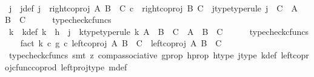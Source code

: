 \begin{isabellebody}
\isanewline
\ \ \isamarkupfalse%
\ j\ \ j{\isacharunderscore}{\kern0pt}def{\isacharcolon}{\kern0pt}\ {\isachardoublequoteopen}j\ {\isacharequal}{\kern0pt}\ {\isacharparenleft}{\kern0pt}right{\isacharunderscore}{\kern0pt}coproj\ A\ {\isacharparenleft}{\kern0pt}B\ {\isasymCoprod}\ C{\isacharparenright}{\kern0pt}{\isacharparenright}{\kern0pt}\ {\isasymcirc}\isactrlsub c\ \ {\isacharparenleft}{\kern0pt}right{\isacharunderscore}{\kern0pt}coproj\ B\ C{\isacharparenright}{\kern0pt}{\isachardoublequoteclose}\ \ j{\isacharunderscore}{\kern0pt}type{\isacharbrackleft}{\kern0pt}type{\isacharunderscore}{\kern0pt}rule{\isacharbrackright}{\kern0pt}{\isacharcolon}{\kern0pt}\ {\isachardoublequoteopen}j\ {\isacharcolon}{\kern0pt}\ C\ {\isasymrightarrow}\ A\ {\isasymCoprod}\ {\isacharparenleft}{\kern0pt}B\ {\isasymCoprod}\ C{\isacharparenright}{\kern0pt}{\isachardoublequoteclose}\isanewline
\ \ \ \ \isamarkupfalse%
\ typecheck{\isacharunderscore}{\kern0pt}cfuncs\isanewline
\ \ \isamarkupfalse%
\ k\ \ k{\isacharunderscore}{\kern0pt}def{\isacharcolon}{\kern0pt}\ {\isachardoublequoteopen}k\ {\isacharequal}{\kern0pt}\ h\ {\isasymamalg}\ j{\isachardoublequoteclose}\ \ k{\isacharunderscore}{\kern0pt}type{\isacharbrackleft}{\kern0pt}type{\isacharunderscore}{\kern0pt}rule{\isacharbrackright}{\kern0pt}{\isacharcolon}{\kern0pt}\ {\isachardoublequoteopen}k{\isacharcolon}{\kern0pt}\ {\isacharparenleft}{\kern0pt}A\ {\isasymCoprod}\ B{\isacharparenright}{\kern0pt}\ {\isasymCoprod}\ C\ {\isasymrightarrow}\ A\ {\isasymCoprod}\ {\isacharparenleft}{\kern0pt}B\ {\isasymCoprod}\ C{\isacharparenright}{\kern0pt}{\isachardoublequoteclose}\isanewline
\ \ \ \ \isamarkupfalse%
\ typecheck{\isacharunderscore}{\kern0pt}cfuncs\isanewline
\isanewline
\ \ \isamarkupfalse%
\ fact{}{\isacharcolon}{\kern0pt}\ {\isachardoublequoteopen}{\isacharparenleft}{\kern0pt}k\ {\isasymcirc}\isactrlsub c\ g{\isacharparenright}{\kern0pt}\ {\isasymcirc}\isactrlsub c\ {\isacharparenleft}{\kern0pt}left{\isacharunderscore}{\kern0pt}coproj\ A\ {\isacharparenleft}{\kern0pt}B\ {\isasymCoprod}\ C{\isacharparenright}{\kern0pt}{\isacharparenright}{\kern0pt}\ {\isacharequal}{\kern0pt}\ {\isacharparenleft}{\kern0pt}left{\isacharunderscore}{\kern0pt}coproj\ A\ {\isacharparenleft}{\kern0pt}B\ {\isasymCoprod}\ C{\isacharparenright}{\kern0pt}{\isacharparenright}{\kern0pt}{\isachardoublequoteclose}\isanewline
\ \ \ \ \isamarkupfalse%
\ {\isacharparenleft}{\kern0pt}typecheck{\isacharunderscore}{\kern0pt}cfuncs{\isacharcomma}{\kern0pt}\ smt\ {\isacharparenleft}{\kern0pt}z{}{\isacharparenright}{\kern0pt}\ comp{\isacharunderscore}{\kern0pt}associative{}\ g{\isacharunderscore}{\kern0pt}prop\ h{\isacharunderscore}{\kern0pt}prop{}\ h{\isacharunderscore}{\kern0pt}type\ j{\isacharunderscore}{\kern0pt}type\ k{\isacharunderscore}{\kern0pt}def\ left{\isacharunderscore}{\kern0pt}coproj{\isacharunderscore}{\kern0pt}cfunc{\isacharunderscore}{\kern0pt}coprod\ left{\isacharunderscore}{\kern0pt}proj{\isacharunderscore}{\kern0pt}type\ m{\isacharunderscore}{\kern0pt}def{\isacharparenright}{\kern0pt}\isanewline

\end{isabellebody}
